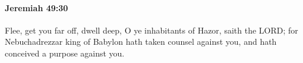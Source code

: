 
		\paragraph{Jeremiah 49:30} %
			\label{JEREMIAH-49-30}

			Flee, get you far off, dwell deep, O ye inhabitants of Hazor, saith the LORD; for Nebuchadrezzar king of Babylon hath taken counsel against you, and hath conceived a purpose against you.


